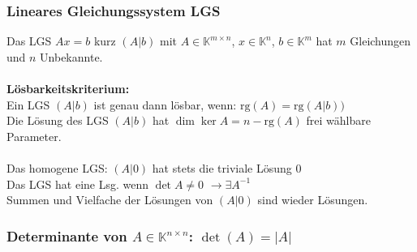 \documentclass[6pt,a4paper]{scrartcl}
\begin{document}
\begin{multicols}{4}
\subsubsection{Lineares Gleichungssystem LGS}
Das LGS $Ax=b$ kurz $(A|b)$ mit $A\in \mathbb K^{m\times n}$, $x\in \mathbb K^n$, $b\in \mathbb K^m$ hat $m$ Gleichungen und $n$ Unbekannte.\\
\\
\textbf{Lösbarkeitskriterium:}\\
Ein LGS $(A|b)$ ist genau dann lösbar, wenn: $\mathrm{rg}(A)=\mathrm{rg}(A|b))$\\
Die Lösung des LGS $(A|b)$ hat $\dim{\ker A} = n-\mathrm{rg}(A)$ frei wählbare Parameter.\\
\\
Das homogene LGS: $(A|0)$ hat stets die triviale Lösung $0$\\
Das LGS hat eine Lsg. wenn $\det A \not= 0$ \quad $\rightarrow \exists A^{-1}$ \\
Summen und Vielfache der Lösungen von $(A|0)$ sind wieder Lösungen.

\subsubsection{Determinante von $A\in \mathbb K^{n\times n}$: $\det(A)=|A|$}


\end{multicols}
\end{document}
